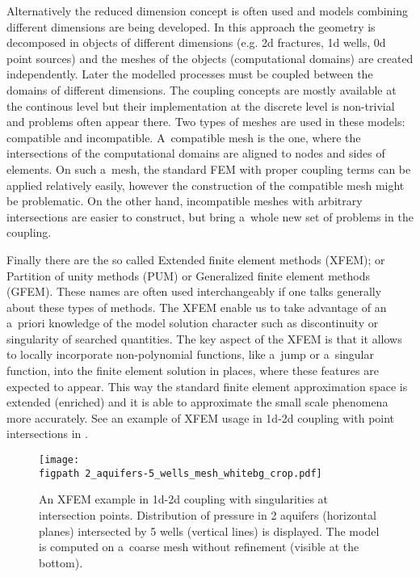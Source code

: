 Alternatively the reduced dimension concept is often used and models combining different dimensions are being developed.
In this approach the geometry is decomposed in objects of different dimensions (e.g. 2d fractures, 1d wells, 0d point sources)
and the meshes of the objects (computational domains) are created independently.
Later the modelled processes must be coupled between the domains of different dimensions.
The coupling concepts are mostly available at the continous level but their implementation
at the discrete level is non-trivial and problems often appear there.
Two types of meshes are used in these models: compatible and incompatible.
A~compatible mesh is the one, where the intersections of the computational domains are aligned to nodes and sides of elements.
On such a~mesh, the standard FEM with proper coupling terms can be applied relatively easily,
however the construction of the compatible mesh might be problematic.
On the other hand, incompatible meshes with arbitrary intersections are easier to construct, 
but bring a~whole new set of problems in the coupling.


Finally there are the so called Extended finite element methods (XFEM); or Partition of unity methods (PUM) or Generalized
finite element methods (GFEM). These names are often used interchangeably if one talks generally about these types of methods. 
The XFEM enable us to take advantage of an a~priori knowledge of the model solution character
such as discontinuity or singularity of searched quantities.
The key aspect of the XFEM is that it allows to locally incorporate non-polynomial functions, like a~jump or a~singular function,
into the finite element solution in places, where these features are expected to appear.
This way the standard finite element approximation space is extended (enriched) and it is able to approximate the small scale phenomena
more accurately.
See an example of XFEM usage in 1d-2d coupling with point intersections in .
\begin{figure}[!htb]
  \centering    
    \texttt{[image: \\figpath 2\_aquifers-5\_wells\_mesh\_whitebg\_crop.pdf]}
  \caption[XFEM example for well-aquifer model with singularities.]
        { An XFEM example in 1d-2d coupling with singularities at intersection points.
            Distribution of pressure in 2 aquifers (horizontal planes) intersected by 5 wells 
            (vertical lines) is displayed. The model is computed on a~coarse mesh without refinement (visible at the bottom). }
  \label{fig:aquifers}
\end{figure}

